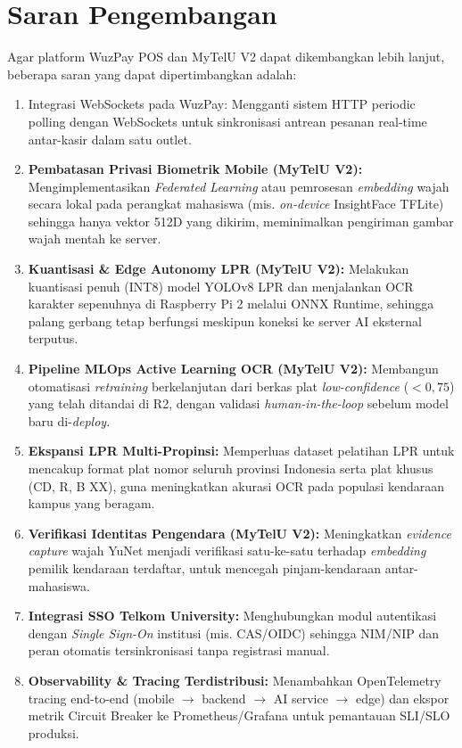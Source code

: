 \documentclass[12pt,titlepage,a4paper]{report}
\begin{document}
\section{Saran Pengembangan}
Agar platform WuzPay POS dan MyTelU V2 dapat dikembangkan lebih lanjut, beberapa saran yang dapat dipertimbangkan adalah:
\begin{enumerate}
    \item Integrasi WebSockets pada WuzPay: Mengganti sistem HTTP periodic polling dengan WebSockets untuk sinkronisasi antrean pesanan real-time antar-kasir dalam satu outlet.
    \item \textbf{Pembatasan Privasi Biometrik Mobile (MyTelU V2):} Mengimplementasikan \textit{Federated Learning} atau pemrosesan \textit{embedding} wajah secara lokal pada perangkat mahasiswa (mis. \textit{on-device} InsightFace TFLite) sehingga hanya vektor 512D yang dikirim, meminimalkan pengiriman gambar wajah mentah ke server.
    \item \textbf{Kuantisasi \& Edge Autonomy LPR (MyTelU V2):} Melakukan kuantisasi penuh (INT8) model YOLOv8 LPR dan menjalankan OCR karakter sepenuhnya di Raspberry Pi 2 melalui ONNX Runtime, sehingga palang gerbang tetap berfungsi meskipun koneksi ke server AI eksternal terputus.
    \item \textbf{Pipeline MLOps Active Learning OCR (MyTelU V2):} Membangun otomatisasi \textit{retraining} berkelanjutan dari berkas plat \textit{low-confidence} ($<0{,}75$) yang telah ditandai di R2, dengan validasi \textit{human-in-the-loop} sebelum model baru di-\textit{deploy}.
    \item \textbf{Ekspansi LPR Multi-Propinsi:} Memperluas dataset pelatihan LPR untuk mencakup format plat nomor seluruh provinsi Indonesia serta plat khusus (CD, R, B XX), guna meningkatkan akurasi OCR pada populasi kendaraan kampus yang beragam.
    \item \textbf{Verifikasi Identitas Pengendara (MyTelU V2):} Meningkatkan \textit{evidence capture} wajah YuNet menjadi verifikasi satu-ke-satu terhadap \textit{embedding} pemilik kendaraan terdaftar, untuk mencegah pinjam-kendaraan antar-mahasiswa.
    \item \textbf{Integrasi SSO Telkom University:} Menghubungkan modul autentikasi dengan \textit{Single Sign-On} institusi (mis. CAS/OIDC) sehingga NIM/NIP dan peran otomatis tersinkronisasi tanpa registrasi manual.
    \item \textbf{Observability \& Tracing Terdistribusi:} Menambahkan OpenTelemetry tracing end-to-end (mobile $\rightarrow$ backend $\rightarrow$ AI service $\rightarrow$ edge) dan ekspor metrik Circuit Breaker ke Prometheus/Grafana untuk pemantauan SLI/SLO produksi.
\end{enumerate}
\end{document}
